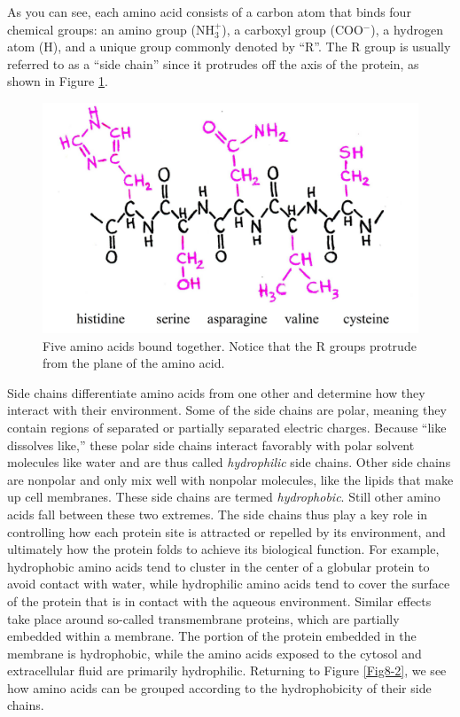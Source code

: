 As you can see, each amino acid consists of a carbon atom that binds four chemical groups: an amino group (NH$_3^+$), a carboxyl group (COO$^-$), a hydrogen atom (H), and a unique group commonly denoted by ``R''. The R group is usually referred to as a ``side chain'' since it protrudes off the axis of the protein, as shown in Figure \ref{Fig8-4}.   
\begin{figure}[htb]
 	\centering
 	\includegraphics[width=\textwidth]{./figures/Topic8/Fig8-4.jpg}
 	\caption{Five amino acids bound together.  Notice that the R groups protrude from the plane of the amino acid.}
  	\label{Fig8-4}
\end{figure}

Side chains differentiate amino acids from one other and determine how they interact with their environment.  Some of the side chains are polar, meaning they contain regions of separated or partially separated electric charges.  Because ``like dissolves like,'' these polar side chains interact favorably with polar solvent molecules like water and are thus called {\it hydrophilic} side chains.  Other side chains are nonpolar and only mix well with nonpolar molecules, like the lipids that make up cell membranes.  These side chains are termed {\it hydrophobic}.  Still other amino acids fall between these two extremes.  The side chains thus play a key role in controlling how each protein site is attracted or repelled by its environment, and ultimately how the protein folds to achieve its biological function.  For example, hydrophobic amino acids tend to cluster in the center of a globular protein to avoid contact with water, while hydrophilic amino acids tend to cover the surface of the protein that is in contact with the aqueous environment.  Similar effects take place around so-called transmembrane proteins, which are partially embedded within a membrane.  The portion of the protein embedded in the membrane is hydrophobic, while the amino acids exposed to the cytosol and extracellular fluid are primarily hydrophilic.  Returning to Figure \ref{Fig8-2}, we see how amino acids can be grouped according to the hydrophobicity of their side chains.
     

